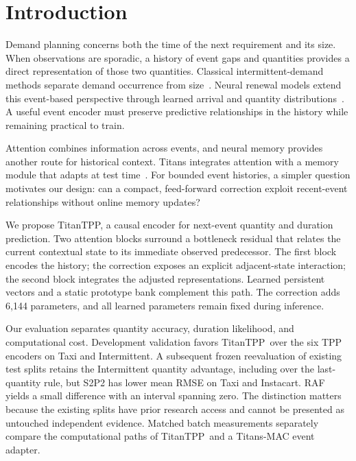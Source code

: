 \documentclass[runningheads]{llncs}
\newcommand{\method}{TitanTPP}
\begin{document}
\section{Introduction}
Demand planning concerns both the time of the next requirement and its size.
When observations are sporadic, a history of event gaps and quantities provides
a direct representation of those two quantities. Classical intermittent-demand
methods separate demand occurrence from size~\cite{croston1972forecasting}.
Neural renewal models extend this event-based perspective through learned
arrival and quantity distributions~\cite{turkmen2021renewal}. A useful event
encoder must preserve predictive relationships in the history while remaining
practical to train.

Attention combines information across events, and neural memory provides
another route for historical context. Titans integrates attention with a
memory module that adapts at test time~\cite{behrouz2025titans}. For bounded
event histories, a simpler question motivates our design: can a compact,
feed-forward correction exploit recent-event relationships without online
memory updates?

We propose \method, a causal encoder for next-event quantity and duration
prediction. Two attention blocks surround a bottleneck residual that relates
the current contextual state to its immediate observed predecessor. The first
block encodes the history; the correction exposes an explicit adjacent-state
interaction; the second block integrates the adjusted representations.
Learned persistent vectors and a static prototype bank complement this path.
The correction adds 6,144 parameters, and all learned parameters remain fixed
during inference.

Our evaluation separates quantity accuracy, duration likelihood, and
computational cost. Development validation favors \method\ over the six
TPP encoders on Taxi and Intermittent. A subsequent frozen reevaluation of
existing test splits retains the Intermittent quantity advantage, including
over the last-quantity rule, but S2P2 has lower mean RMSE on Taxi and
Instacart. RAF yields a small difference with an interval spanning zero.
The distinction matters because the existing splits have prior research
access and cannot be presented as untouched independent evidence.
Matched batch measurements separately compare the computational paths of
\method\ and a Titans-MAC event adapter.
\end{document}
